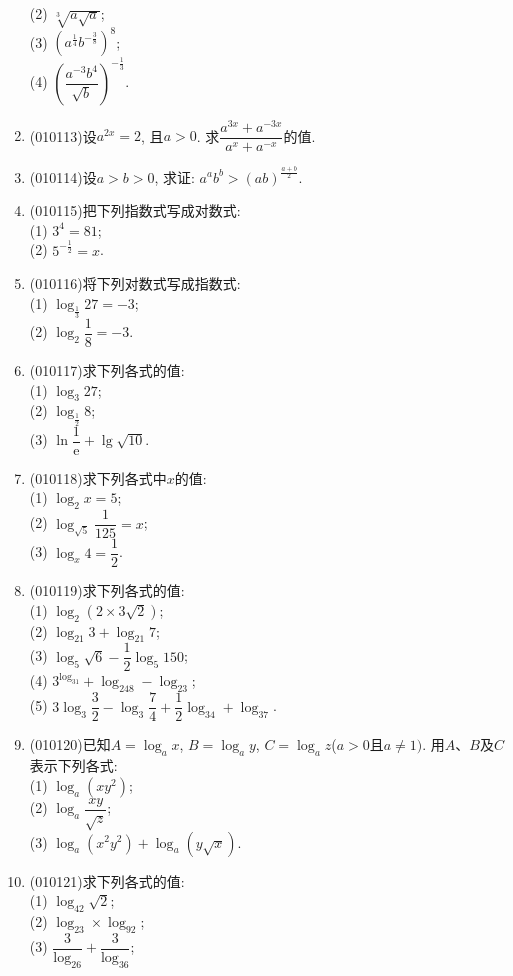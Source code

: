 \documentclass[10pt,a4paper]{article}
\begin{document}
\begin{enumerate}[1.]
(2) $\sqrt[3]{a\sqrt a}$;\\
(3) $(a^\frac 14b^{-\frac 38})^8$;\\
(4) $(\dfrac {a^{-3}b^4}{\sqrt b})^{-\frac 13}$.
\item {\tiny (010113)}设$a^{2x}=2$, 且$a>0$. 求$\dfrac{a^{3x}+a^{-3x}}{a^x+a^{-x}}$的值.
\item {\tiny (010114)}设$a>b>0$, 求证: $a^ab^b>(ab)^\frac{a+b}2$.
\item {\tiny (010115)}把下列指数式写成对数式:\\
(1) $3^4=81$;\\
(2) $5^{-\frac1 2}=x$.
\item {\tiny (010116)}将下列对数式写成指数式:\\
(1) $\log_{\frac 13}27=-3$;\\
(2) $\log_2\dfrac 18=-3$.
\item {\tiny (010117)}求下列各式的值:\\
(1) $\log_3 27$;\\
(2) $\log_{\frac 12}8$;\\
(3) $\ln \dfrac 1{\mathrm{e}}+\lg \sqrt {10}$.
\item {\tiny (010118)}求下列各式中$x$的值:\\
(1) $\log_2x=5$;\\
(2) $\log_{\sqrt 5}\dfrac1{125}=x$;\\
(3) $\log_x4=\dfrac 12$.
\item {\tiny (010119)}求下列各式的值:\\
(1) $\log_2(2\times 3\sqrt 2)$;\\
(2) $\log_{21}3+\log_{21}7$;\\
(3) $\log_5\sqrt 6-\dfrac 12\log_5 150$;\\
(4) $3^{\log_31}+\log_248-\log_23$;\\
(5) $3\log_3\dfrac 32-\log_3\dfrac 74+\dfrac 12\log_34+\log_37$.
\item {\tiny (010120)}已知$A=\log_ax$, $B=\log_ay$, $C=\log_az$($a>0$且$a\ne 1)$. 用$A$、$B$及$C$表示下列各式:\\
(1) $\log_a(xy^2)$;\\
(2) $\log_a\dfrac{xy}{\sqrt z}$;\\
(3) $\log_a(x^2y^2)+\log_a(y\sqrt x)$.
\item {\tiny (010121)}求下列各式的值:\\
(1) $\log_42\sqrt 2$;\\
(2) $\log_23\times \log_92$;\\
(3) $\dfrac 3{\log_26}+\dfrac 3{\log_36}$;\\

\end{enumerate}
\end{document}
